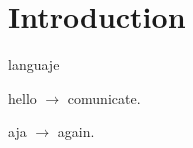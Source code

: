 \documentclass{beamer}
\begin{document}
\section{Introduction}

\begin{frame}{languaje}
    \begin{description}
        \item hello $\rightarrow$ comunicate.
        \item aja $\rightarrow$ again.
    \end{description}
\end{frame}
\end{document}
